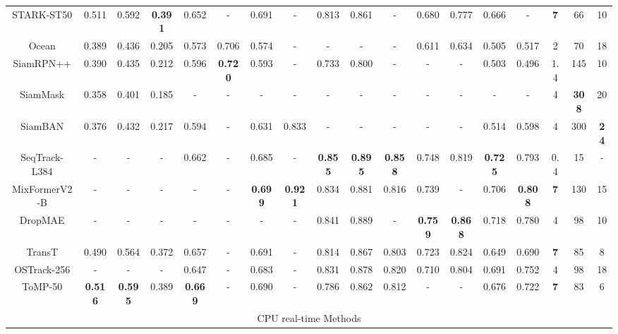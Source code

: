 \begin{table}[th!]
{\begin{tabular}{c |c c  c  |c c  |c c |c c  c |c c |c c |c c c}
	STARK-ST50 \cite{yan2021learning}         & 0.511 & 0.592 & \bf{0.391}       & 0.652  & - & 0.691  & - & 0.813  & 0.861  & - & 0.680  & 0.777 & 0.666  & -  & \bf{7} & 66 & 10\\
	Ocean \cite{zhang2020ocean}               & 0.389 & 0.436 & 0.205       & 0.573  & 0.706 & 0.574  & - & -  & -  & - & 0.611  & 0.634  & 0.505  & 0.517 & 2  & 70 & 18\\
	SiamRPN++ \cite{li2019siamrpn++}          & 0.390 & 0.435 & 0.212       & 0.596  & \bf{0.720} & 0.593  & - & 0.733  & 0.800  & - & -  &  - & 0.503  & 0.496  & 1.4 & 145 & 10 \\
	SiamMask \cite{wang2019fast}              & 0.358 & 0.401 & 0.185       & - & -  & - & -  & -  & - & -  & -  & - & - & -  & 4 & \bf{308} & 20 \\
	SiamBAN \cite{chen2020siamese}            & 0.376 & 0.432 & 0.217       & 0.594  & - & 0.631  & 0.833  & -  & -  & - & -  & - & 0.514  & 0.598 & 4 & 300 & \bf{24} \\
	SeqTrack-L384 \cite{chen2023seqtrack}     & - & - & -                   & 0.662  & - & 0.685  & - & \bf{0.855}  & \bf{0.895}  & \bf{0.858} & 0.748  & 0.819  & \bf{0.725}  & 0.793  & 0.4 & 15 & -\\
	MixFormerV2-B \cite{cui2024mixformerv2}   & - & - & -                   & -  & - & \bf{0.699}  & \bf{0.921} & 0.834  & 0.881  & 0.816 & 0.739  & -  & 0.706  & \bf{0.808}  & \bf{7} & 130 & 15 \\
	DropMAE \cite{wu2023dropmae}              & - & - & -                   & -  & - & -  & - & 0.841  & 0.889  & - & \bf{0.759}  & \bf{0.868}  & 0.718  & 0.780  & 4 & 98 & 10 \\
	TransT \cite{chen2021transformer}         & 0.490 & 0.564 & 0.372       & 0.657  & - & 0.691  & - & 0.814  & 0.867  & 0.803 & 0.723  & 0.824   & 0.649  & 0.690  & \bf{7} & 85 & 8 \\
	OSTrack-256 \cite{ye2022joint}            & - & - & -                   & 0.647  & - & 0.683  & - & 0.831  & 0.878  & 0.820 & 0.710  & 0.804  & 0.691  & 0.752 & 4 & 98 & 18 \\
	ToMP-50 \cite{mayer2022transforming}      & \bf{0.516} & \bf{0.595} & 0.389      & \bf{0.669}  & - & 0.690  & - & 0.786  & 0.862  & 0.812 & -  & - & 0.676  & 0.722  & \bf{7} & 83 & 6 \\
	
	\hline
	\multicolumn{18}{c}{CPU real-time Methods} \\
	\hline  
	

\end{tabular}}
\end{table}
